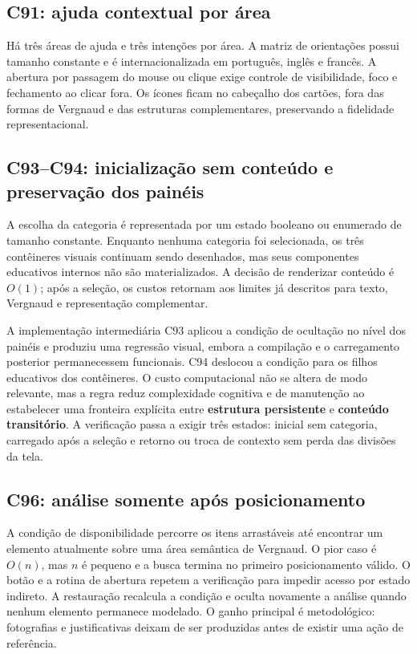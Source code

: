 \documentclass[12pt,a4paper]{article}
\begin{document}
\subsection{C91: ajuda contextual por área}
Há três áreas de ajuda e três intenções por área. A matriz de orientações possui tamanho constante e é internacionalizada em português, inglês e francês. A abertura por passagem do mouse ou clique exige controle de visibilidade, foco e fechamento ao clicar fora. Os ícones ficam no cabeçalho dos cartões, fora das formas de Vergnaud e das estruturas complementares, preservando a fidelidade representacional.


\subsection{C93--C94: inicialização sem conteúdo e preservação dos painéis}
A escolha da categoria é representada por um estado booleano ou enumerado de tamanho constante. Enquanto nenhuma categoria foi selecionada, os três contêineres visuais continuam sendo desenhados, mas seus componentes educativos internos não são materializados. A decisão de renderizar conteúdo é $O(1)$; após a seleção, os custos retornam aos limites já descritos para texto, Vergnaud e representação complementar.

A implementação intermediária C93 aplicou a condição de ocultação no nível dos painéis e produziu uma regressão visual, embora a compilação e o carregamento posterior permanecessem funcionais. C94 deslocou a condição para os filhos educativos dos contêineres. O custo computacional não se altera de modo relevante, mas a regra reduz complexidade cognitiva e de manutenção ao estabelecer uma fronteira explícita entre \textbf{estrutura persistente} e \textbf{conteúdo transitório}. A verificação passa a exigir três estados: inicial sem categoria, carregado após a seleção e retorno ou troca de contexto sem perda das divisões da tela.

\subsection{C96: análise somente após posicionamento}
A condição de disponibilidade percorre os itens arrastáveis até encontrar um elemento atualmente sobre uma área semântica de Vergnaud. O pior caso é $O(n)$, mas $n$ é pequeno e a busca termina no primeiro posicionamento válido. O botão e a rotina de abertura repetem a verificação para impedir acesso por estado indireto. A restauração recalcula a condição e oculta novamente a análise quando nenhum elemento permanece modelado. O ganho principal é metodológico: fotografias e justificativas deixam de ser produzidas antes de existir uma ação de referência.
\end{document}
